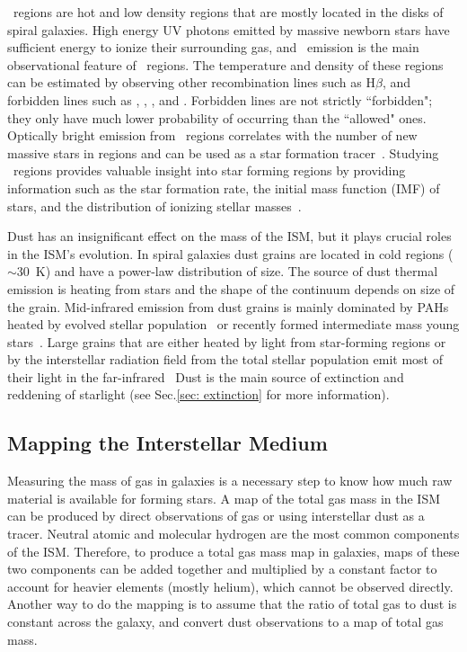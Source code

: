 \hii~regions are hot and low density regions that are mostly located in the disks of spiral galaxies.
High energy UV photons emitted by massive newborn stars have sufficient energy to ionize their surrounding gas, and
~\halpha emission is the main observational feature of \hii~regions.
The temperature and density of these regions can be estimated by observing other recombination lines such as H$\beta$, and forbidden lines such as \sii, \oii, \oiii, and \nii. 
Forbidden lines are not strictly ``forbidden"; they only have much lower probability of occurring than the ``allowed" ones.
Optically bright \halpha emission from \hii~regions correlates with the number of new massive stars in regions and can be used as a star formation tracer~\citep[e.g.][]{Kennicutt98b,Calzetti13}.
Studying \hii~regions provides valuable insight into star forming regions by providing information such as the star formation rate, the initial mass function (IMF) of stars, and the distribution of ionizing stellar masses~\citep[][and references therein]{Azimlu11}.


Dust has an insignificant effect on the mass of the ISM, but it plays crucial roles in the ISM's evolution.
In spiral galaxies dust grains are located in cold regions ($\sim$30~K) and have a power-law distribution of size.
The source of dust thermal emission is heating from stars and the shape of the continuum depends on size of the grain.
Mid-infrared emission from dust grains is mainly dominated by PAHs heated by evolved stellar population~\cite{Smith07a} or recently formed intermediate mass young stars~\cite{Peeters04}. 
Large grains that are either heated by light from star-forming regions or by the interstellar radiation field from the total stellar population emit most of their light in the far-infrared~\citep[e.g.][]{Calapa14, lu14}
Dust is the main source of extinction and reddening of starlight (see Sec.\ref{sec: extinction} for more information).

\subsection{Mapping the Interstellar Medium} 
\label{sec: ismmap}
Measuring the mass of gas in galaxies is a necessary step to know how much raw material is available for forming stars.
A map of the total gas mass in the ISM can be produced by direct observations of gas or using interstellar dust as a tracer. 
Neutral atomic and molecular hydrogen are the most common components of the ISM. 
Therefore, to produce a total gas mass map in galaxies, maps of these two components can be added together and multiplied by a constant factor to account for heavier elements (mostly helium), which cannot be observed directly. 
Another way to do the mapping is to assume that the ratio of total gas to dust is constant across the galaxy, and convert dust observations to a map of total gas mass.


